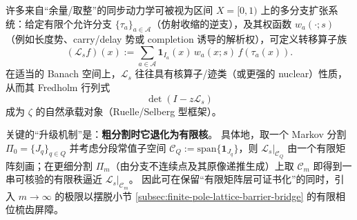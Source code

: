 \begin{remark}[转移算子细化的最小可执行机制]\label{rem:transfer-operator-refinement-interface}
许多来自“余量/取整”的同步动力学可被视为区间 \(X=[0,1)\) 上的多分支扩张系统：给定有限个允许分支 \(\{\tau_a\}_{a\in\mathcal{A}}\)（仿射收缩的逆支），及其权函数 \(w_a(\cdot;s)\)（例如长度势、carry/delay 势或 completion 诱导的解析权），可定义转移算子族
$$
(\mathcal{L}_s f)(x):=\sum_{a\in\mathcal{A}} \mathbf{1}_{I_a}(x)\,w_a(x;s)\,f(\tau_a(x)).
$$
在适当的 Banach 空间上，\(\mathcal{L}_s\) 往往具有核算子/迹类（或更强的 nuclear）性质，从而其 Fredholm 行列式
$$
\det(I-z\mathcal{L}_s)
$$
成为 \(\zeta\) 的自然承载对象（Ruelle/Selberg 型框架）。
\par
关键的“升级机制”是：\textbf{粗分割时它退化为有限核}。
具体地，取一个 Markov 分割 \(\Pi_0=\{J_q\}_{q\in Q}\) 并考虑分段常值子空间 \(\mathcal{C}_{Q}:=\mathrm{span}\{\mathbf{1}_{J_q}\}\)，则 \(\mathcal{L}_s|_{\mathcal{C}_{Q}}\) 由一个有限矩阵刻画；在更细分割 \(\Pi_m\)（由分支不连续点及其原像递推生成）上取 \(\mathcal{C}_m\) 即得到一串可核验的有限秩逼近 \(\mathcal{L}_s|_{\mathcal{C}_m}\)。
因此可在保留“有限矩阵层可证书化”的同时，引入 \(m\to\infty\) 的极限以摆脱小节 \ref{subsec:finite-pole-lattice-barrier-bridge} 的有限相位梳齿屏障。
\end{remark}

